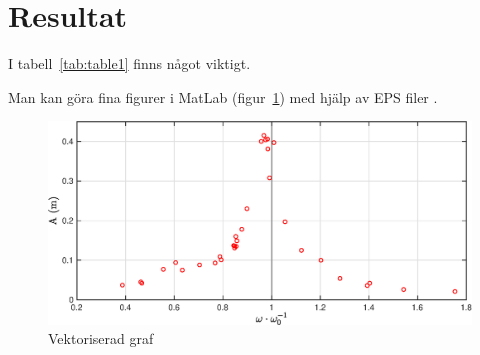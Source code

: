 \pagebreak
\section{Resultat}
I tabell~\ref{tab:table1} finns något viktigt.


Man kan göra fina figurer i MatLab (figur~\ref{fig:example}) med hjälp av EPS filer \cite{HOWTO:1}.

\begin{figure}[ht]
    \centering
    \captionsetup{justification=centering,margin=2cm}
    \includegraphics[scale=0.5]{Resources/Graphics/example1.eps}
    \caption{Vektoriserad graf}
    \label{fig:example}
\end{figure}